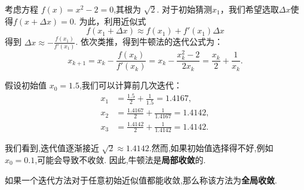 考虑方程 $f(x) = x^2 - 2 = 0$,其根为 $\sqrt{2}$. 
对于初始猜测$x_1$，我们希望选取$\Delta x$使得$f(x+\Delta x) = 0$.
为此，利用近似式
$$
f(x_1 + \Delta x) \approx f(x_1) + f'(x_1) \Delta x
$$
得到 $\Delta x \approx - \frac{f(x_1)}{f'(x_1)}$. 
依次类推，得到牛顿法的迭代公式为：
\[
x_{k+1} = x_k - \frac{f(x_k)}{f'(x_k)} = x_k - \frac{x_k^2 - 2}{2x_k} = \frac{x_k}{2} + \frac{1}{x_k}.
\]

假设初始值 $x_0 = 1.5$,我们可以计算前几次迭代：
\[
\begin{aligned}
x_1 &= \frac{1.5}{2} + \frac{1}{1.5} = 1.4167, \\
x_2 &= \frac{1.4167}{2} + \frac{1}{1.4167} = 1.4142, \\
x_3 &= \frac{1.4142}{2} + \frac{1}{1.4142} = 1.4142.
\end{aligned}
\]

我们看到,迭代值逐渐接近 $\sqrt{2} \approx 1.4142$.然而,如果初始值选择得不好,例如 $x_0 = 0.1$,可能会导致不收敛.
因此,牛顿法是\textbf{局部收敛}的.


如果一个迭代方法对于任意初始近似值都能收敛,那么称该方法为\textbf{全局收敛}.





